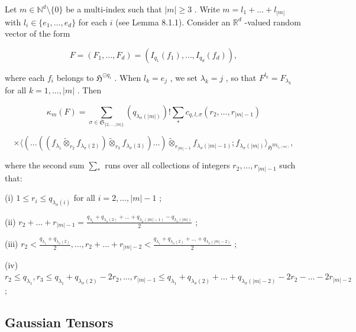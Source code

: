 \documentclass[]{article}
\numberwithin{equation}{section}
\theoremstyle{definition}
\begin{document}
\begin{lemma}
Let $m \in \mathbb{N}^d \setminus \{0\}$ be a multi-index such that $|m| \geq 3$ . Write $m = l_1 + \ldots + l_{|m|}$ with $l_i \in \{e_1, \ldots, e_d\}$ for each $i$ (see Lemma 8.1.1). Consider an $\mathbb{R}^d$ -valued random vector of the form

$$
F = (F_1, \ldots, F_d) = (I_{q_1}(f_1), \ldots, I_{q_d}(f_d)),
$$

where each $f_i$ belongs to $\mathfrak{H}^{\odot q_i}$ . When $l_k = e_j$ , we set $\lambda_k = j$ , so that $F^{l_k} = F_{\lambda_k}$ for all $k = 1, \ldots, |m|$ . Then

$$
\kappa_m(F) = \sum_{\sigma \in \mathfrak{S}_{\{2, \ldots, |m|\}}} (q_{\lambda_\sigma(|m|)})! \sum_* c_{q,l,\sigma}(r_2, \ldots, r_{|m|-1})
$$

$$
\times \langle (\ldots ((f_{\lambda_1} \widetilde{\otimes}_{r_2} f_{\lambda_\sigma(2)}) \widetilde{\otimes}_{r_3} f_{\lambda_\sigma(3)}) \ldots) \widetilde{\otimes}_{r_{|m|-1}} f_{\lambda_\sigma(|m|-1)}; f_{\lambda_\sigma(|m|)} \rangle_{\mathfrak{H}^{\otimes q_{\lambda_\sigma(|m|)}}},
$$

where the second sum $\sum_*$ runs over all collections of integers $r_2, \ldots, r_{|m|-1}$ such that:

(i) $1 \leq r_i \leq q_{\lambda_\sigma(i)}$ for all $i = 2, \ldots, |m|-1$ ;

(ii) $r_2 + \ldots + r_{|m|-1} = \frac{q_{\lambda_1} + q_{\lambda_\sigma(2)} + \ldots + q_{\lambda_\sigma(|m|-1)} - q_{\lambda_\sigma(|m|)}}{2}$ ;

(iii) $r_2 < \frac{q_{\lambda_1} + q_{\lambda_\sigma(2)}}{2}, \ldots, r_2 + \ldots + r_{|m|-2} < \frac{q_{\lambda_1} + q_{\lambda_\sigma(2)} + \ldots + q_{\lambda_\sigma(|m|-2)}}{2}$ ;

(iv) $r_2 \leq q_{\lambda_1}, r_3 \leq q_{\lambda_1} + q_{\lambda_\sigma(2)} - 2r_2, \ldots, r_{|m|-1} \leq q_{\lambda_1} + q_{\lambda_\sigma(2)} + \ldots + q_{\lambda_\sigma(|m|-2)} - 2r_2 - \ldots - 2r_{|m|-2}$ ;
\label{lemma:cummulants}
\end{lemma}

\subsection{Gaussian Tensors}
\end{document}
